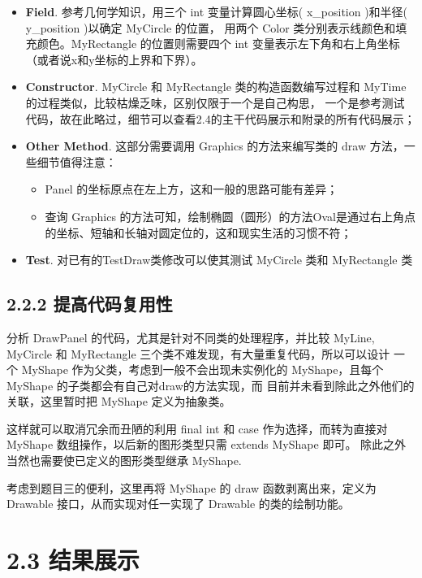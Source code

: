 \begin{itemize}
	\item \textbf{Field}. 参考几何学知识，用三个 int 变量计算圆心坐标( x\_position )和半径( y\_position )以确定 MyCircle 的位置，
	用两个 Color 类分别表示线颜色和填充颜色。MyRectangle 的位置则需要四个 int 变量表示左下角和右上角坐标（或者说x和y坐标的上界和下界）。
	\item \textbf{Constructor}. MyCircle 和 MyRectangle 类的构造函数编写过程和 MyTime 的过程类似，比较枯燥乏味，区别仅限于一个是自己构思，
	一个是参考测试代码，故在此略过，细节可以查看2.4的主干代码展示和附录的所有代码展示；
	\item \textbf{Other Method}. 这部分需要调用 Graphics 的方法来编写类的 draw 方法，一些细节值得注意：
	\begin{itemize}
		\item Panel 的坐标原点在左上方，这和一般的思路可能有差异；
		\item 查询 Graphics 的方法可知，绘制椭圆（圆形）的方法Oval是通过右上角点的坐标、短轴和长轴对圆定位的，这和现实生活的习惯不符；
	\end{itemize}
	\item \textbf{Test}. 对已有的TestDraw类修改可以使其测试 MyCircle 类和 MyRectangle 类
\end{itemize}

\subsection{2.2.2 提高代码复用性}
分析 DrawPanel 的代码，尤其是针对不同类的处理程序，并比较 MyLine, MyCircle 和 MyRectangle 三个类不难发现，有大量重复代码，所以可以设计
一个 MyShape 作为父类，考虑到一般不会出现未实例化的 MyShape，且每个 MyShape 的子类都会有自己对draw的方法实现，而
目前并未看到除此之外他们的关联，这里暂时把 MyShape 定义为抽象类。

这样就可以取消冗余而丑陋的利用 final int 和 case 作为选择，而转为直接对 MyShape 数组操作，以后新的图形类型只需 extends MyShape 即可。
除此之外当然也需要使已定义的图形类型继承 MyShape.

考虑到题目三的便利，这里再将 MyShape 的 draw 函数剥离出来，定义为 Drawable 接口，从而实现对任一实现了 Drawable 的类的绘制功能。

\section{2.3 结果展示}

